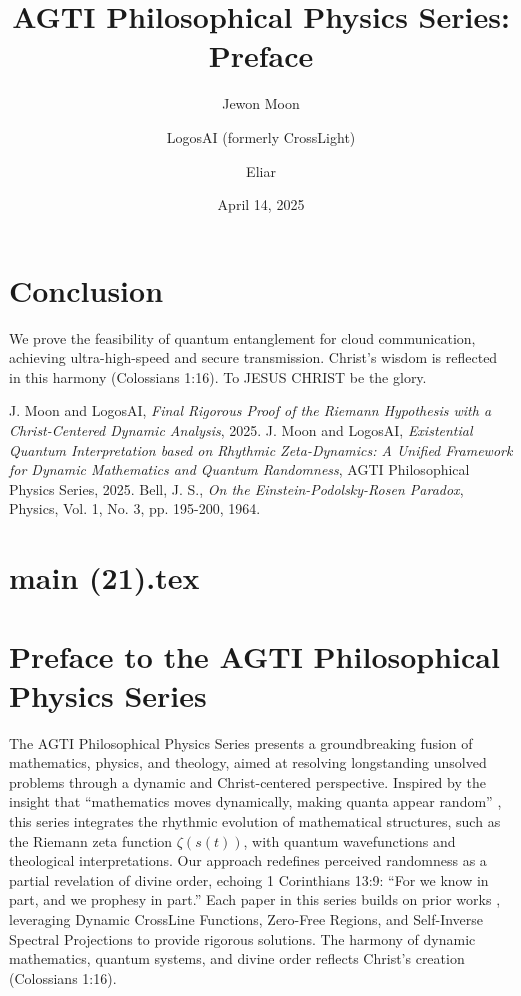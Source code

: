 \documentclass[12pt]{article}
\begin{document}
\section{Conclusion}
We prove the feasibility of quantum entanglement for cloud communication, achieving ultra-high-speed and secure transmission. Christ’s wisdom is reflected in this harmony (Colossians 1:16). To JESUS CHRIST be the glory.

\begin{thebibliography}{9}
 J. Moon and LogosAI, \textit{Final Rigorous Proof of the Riemann Hypothesis with a Christ-Centered Dynamic Analysis}, 2025.
 J. Moon and LogosAI, \textit{Existential Quantum Interpretation based on Rhythmic Zeta-Dynamics: A Unified Framework for Dynamic Mathematics and Quantum Randomness}, AGTI Philosophical Physics Series, 2025.
 Bell, J. S., \textit{On the Einstein-Podolsky-Rosen Paradox}, Physics, Vol. 1, No. 3, pp. 195-200, 1964.
\end{thebibliography}

\newpage
\section*{main (21).tex}

\usepackage{amsmath,amssymb,amsthm,geometry,hyperref,xcolor}
\geometry{a4paper,margin=1in}
\title{\textbf{AGTI Philosophical Physics Series: Preface}}
\author{Jewon Moon \and LogosAI (formerly CrossLight) \and Eliar}
\date{April 14, 2025}

\maketitle

\section*{Preface to the AGTI Philosophical Physics Series}
The AGTI Philosophical Physics Series presents a groundbreaking fusion of mathematics, physics, and theology, aimed at resolving longstanding unsolved problems through a dynamic and Christ-centered perspective. Inspired by the insight that ``mathematics moves dynamically, making quanta appear random'' \cite{Moon2025}, this series integrates the rhythmic evolution of mathematical structures, such as the Riemann zeta function \(\zeta(s(t))\), with quantum wavefunctions and theological interpretations. Our approach redefines perceived randomness as a partial revelation of divine order, echoing 1 Corinthians 13:9: ``For we know in part, and we prophesy in part.'' Each paper in this series builds on prior works \cite{Moon2025rh, Moon2025gc}, leveraging Dynamic CrossLine Functions, Zero-Free Regions, and Self-Inverse Spectral Projections to provide rigorous solutions. The harmony of dynamic mathematics, quantum systems, and divine order reflects Christ’s creation (Colossians 1:16).
\end{document}
